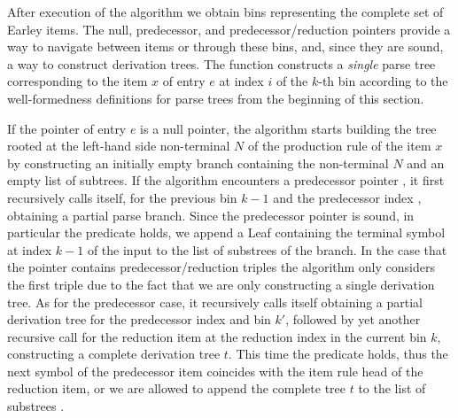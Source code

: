 \begin{isabellebody}
\isadelimproof
%
\endisadelimproof
%
\isatagproof
%
\endisatagproof
{\isafoldproof}%
%
\isadelimproof
%
\endisadelimproof
%
\isadelimdocument
%
\endisadelimdocument
%
\isatagdocument
%
\isamarkuptrue%
%
\endisatagdocument
{\isafolddocument}%
%
\isadelimdocument
%
\endisadelimdocument
%
\begin{isamarkuptext}%
After execution of the  algorithm we obtain bins representing the complete set
of Earley items. The null, predecessor, and predecessor/reduction pointers provide a way to navigate
between items or through these bins, and, since they are sound, a way to construct derivation trees.
The function  constructs a \textit{single} parse tree corresponding to the item $x$ of entry $e$ at index $i$ of the $k$-th bin according to the
well-formedness definitions for parse trees from the beginning of this section.

If the pointer of entry $e$ is a null pointer, the algorithm starts building the tree rooted at
the left-hand side non-terminal $N$ of the production rule of the item $x$ by constructing an initially
empty branch containing the non-terminal $N$ and an empty list of subtrees. If the algorithm encounters
a predecessor pointer , it first recursively calls itself, for the previous bin $k-1$ and the
predecessor index , obtaining a partial parse branch. Since the predecessor pointer is sound,
in particular the  predicate holds, we append a Leaf containing the terminal symbol at index
$k-1$ of the input \isa{{\isasymomega}} to the list of substrees of the branch. In the case that
the pointer contains predecessor/reduction triples the algorithm only considers the first triple
 due to the fact that we are only constructing a single derivation tree. As for the predecessor
case, it recursively calls itself obtaining a partial derivation tree  for the predecessor index 
and bin $k'$, followed by yet another recursive call for the reduction item at the reduction index 
in the current bin $k$, constructing a complete derivation tree $t$. This time the 
predicate holds, thus the next symbol of the predecessor item coincides with the item rule head of
the reduction item, or we are allowed to append the complete tree $t$ to the list of substrees .


\end{isamarkuptext}
\end{isabellebody}

